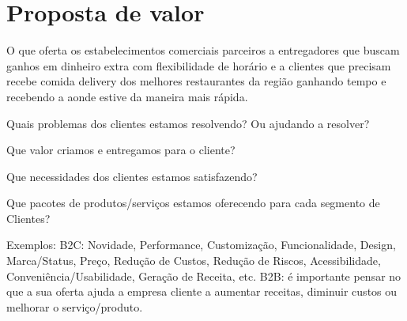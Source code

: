 \section{\textbf{Proposta de valor}}
\label{sec: Proposta de valor}

O que oferta os estabelecimentos comerciais parceiros a entregadores que buscam ganhos em dinheiro extra com flexibilidade de horário e a clientes que precisam recebe comida delivery dos melhores restaurantes da região ganhando tempo e recebendo a aonde estive da maneira mais rápida.\par


\begin{commentA} \vspace{0.3cm} \noindent Quais problemas dos clientes estamos resolvendo? Ou ajudando a resolver? \par \vspace{0.1cm} \end{commentA}



\begin{commentA} \vspace{0.3cm} \noindent Que valor criamos e entregamos para o cliente?\par \vspace{0.1cm} \end{commentA}



\begin{commentA} \vspace{0.3cm} \noindent Que necessidades dos clientes estamos satisfazendo?\par \vspace{0.1cm} \end{commentA}



\begin{commentA} \vspace{0.3cm} \noindent Que pacotes de produtos/serviços estamos oferecendo para cada segmento de Clientes? \par \vspace{0.1cm} \end{commentA}



\begin{commentA} \vspace{0.3cm} \noindent Exemplos:
B2C: Novidade, Performance, Customização, Funcionalidade, Design, Marca/Status, Preço, Redução de Custos, Redução de Riscos, Acessibilidade, Conveniência/Usabilidade, Geração de Receita, etc.
B2B: é importante pensar no que a sua oferta ajuda a empresa cliente a aumentar receitas, diminuir custos ou melhorar o serviço/produto.\par \vspace{0.1cm} \end{commentA}


